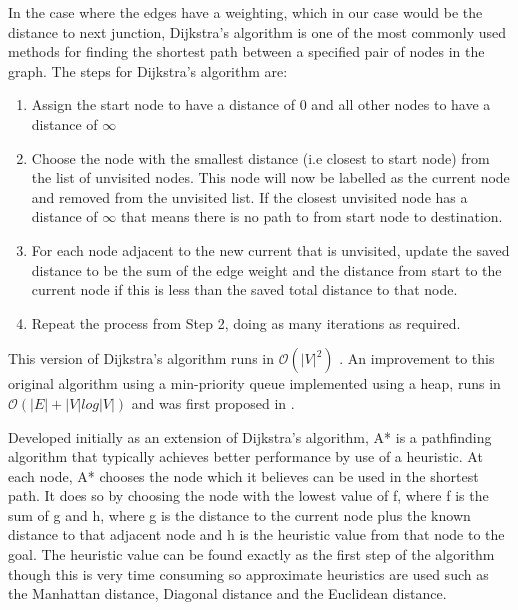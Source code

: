 In the case where the edges have a weighting, which in our case would be the 
distance to next junction, Dijkstra's algorithm is one 
of the most commonly used methods for finding the shortest path between a 
specified pair of nodes in the graph. The steps for Dijkstra's algorithm are:
\begin{enumerate}
\item Assign the start node to have a distance of 0 and all other nodes to 
have a distance of $\infty$
\item Choose the node with the smallest distance (i.e closest to start node) 
from the list of unvisited nodes. This node will now be labelled as the 
current node and removed from the unvisited list. If the closest unvisited 
node has a distance of $\infty$ that means there is no path to from start 
node to destination.
\item For each node adjacent to the new current that is unvisited, update 
the saved distance to be the sum of the edge weight and the distance from 
start to the current node if this is less than the saved total distance to 
that node. 
\item Repeat the process from Step 2, doing as many iterations as required.
\end{enumerate}
This version of Dijkstra's algorithm runs in $\mathcal{O}(|V|^{2})$ 
\cite{xu2007improved}. An improvement to this original algorithm using a 
min-priority queue implemented using a heap, runs in $\mathcal{O}
(|E| + |V|log |V|)$ and was first proposed in \cite{fredman1987fibonacci}. 

Developed initially as an extension of Dijkstra's algorithm, A* is a 
pathfinding algorithm that typically achieves better performance by 
use of a heuristic. At each node, A* chooses the node which it believes 
can be used in the shortest path. It does so by choosing the node with 
the lowest value of f, where f is the sum of g and h, where g is the 
distance to the current node plus the known distance to that adjacent 
node and h is the heuristic value from that node to the goal. The heuristic 
value can be found exactly as the first step of the algorithm though 
this is very time consuming so approximate heuristics are used such 
as the Manhattan distance, Diagonal distance and the Euclidean distance. 